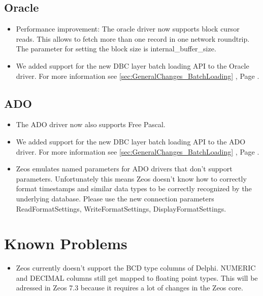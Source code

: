 \documentclass[a4paper,12pt,oneside]{article}
\begin{document}
\subsection{Oracle}
\label{sec:DriverSpecificChanges_Oracle}
\begin{itemize}
\item
  Performance improvement: The oracle driver now supports block cursor reads.
	This allows to fetch more than one record in one network roundtrip.
	The parameter for setting the block size is internal\_buffer\_size.
\item
  We added support for the new DBC layer batch loading API to the Oracle driver.
	For more information see \ref{sec:GeneralChanges_BatchLoading} , Page \pageref{sec:GeneralChanges_BatchLoading}.
\end{itemize}

\subsection{ADO}
\label{sec:DriverSpecificChanges_Ado}
\begin{itemize}
\item
  The ADO driver now also supports Free Pascal.
\item
  We added support for the new DBC layer batch loading API to the ADO driver.
	For more information see \ref{sec:GeneralChanges_BatchLoading} , Page \pageref{sec:GeneralChanges_BatchLoading}.
\item
  Zeos emulates named parameters for ADO drivers that don't support parameters.
	Unfortunately this means Zeos doesn't know how to correctly format timestamps and similar data types to be correctly recognized by the underlying database.
	Please use the new connection parameters ReadFormatSettings, WriteFormatSettings, DisplayFormatSettings.
\end{itemize}

\section{Known Problems}
\label{sec:KnownProblems}
\begin{itemize}
\item 
  Zeos currently doesn't support the BCD type columns of Delphi.
	NUMERIC and DECIMAL columns still get mapped to floating point types.
	This will be adressed in Zeos 7.3 because it requires a lot of changes in the Zeos core.
\end{itemize}
\end{document}
